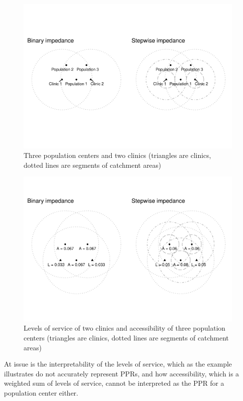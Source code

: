 \documentclass[10pt,letterpaper]{article}
\begin{document}
\begin{figure}
\includegraphics[width=0.95\linewidth]{Supply_and_Demand_Inflation_in_FCA_Methods_v2.1_files/figure-latex/fig3-example-3-1} \caption{\label{fig:fig3-example-3}Three population centers and two clinics (triangles are clinics, dotted lines are segments of catchment areas)}\label{fig:fig3-example-3}
\end{figure}

\begin{figure}
\includegraphics[width=0.95\linewidth]{Supply_and_Demand_Inflation_in_FCA_Methods_v2.1_files/figure-latex/fig4-example-4-1} \caption{\label{fig:fig4-example-4}Levels of service of two clinics and accessibility of three population centers (triangles are clinics, dotted lines are segments of catchment areas)}\label{fig:fig4-example-4}
\end{figure}

At issue is the interpretability of the levels of service, which as the
example illustrates do not accurately represent PPRs, and how
accessibility, which is a weighted sum of levels of service, cannot be
interpreted as the PPR for a population center either.
\end{document}
